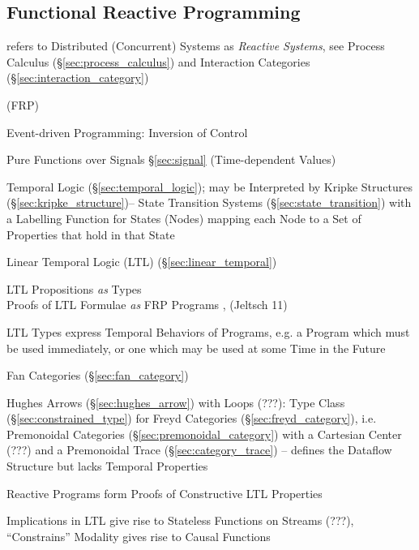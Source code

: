 \subsection{Functional Reactive Programming}\label{sec:frp}


\fist \cite{winskel-nielsen93} refers to Distributed (Concurrent)
Systems as \emph{Reactive Systems}, see Process Calculus
(\S\ref{sec:process_calculus}) and Interaction Categories
(\S\ref{sec:interaction_category})

(FRP)

Event-driven Programming: Inversion of Control %

Pure Functions over Signals \S\ref{sec:signal} (Time-dependent Values)

Temporal Logic (\S\ref{sec:temporal_logic}); may be Interpreted by
Kripke Structures (\S\ref{sec:kripke_structure})-- State Transition
Systems (\S\ref{sec:state_transition}) with a Labelling Function for
States (Nodes) mapping each Node to a Set of Properties that hold in
that State

Linear Temporal Logic (LTL) (\S\ref{sec:linear_temporal})

LTL Propositions \emph{as} Types \\
Proofs of LTL Formulae \emph{as} FRP Programs \cite{jeffrey12},
(Jeltsch 11)

LTL Types express Temporal Behaviors of Programs, e.g. a Program which
must be used immediately, or one which may be used at some Time in the
Future \cite{jeffrey12} %

Fan Categories (\S\ref{sec:fan_category}) \cite{jeltsch12}

Hughes Arrows (\S\ref{sec:hughes_arrow}) with Loops (???): Type Class
(\S\ref{sec:constrained_type}) for Freyd Categories
(\S\ref{sec:freyd_category}), i.e. Premonoidal Categories
(\S\ref{sec:premonoidal_category}) with a Cartesian Center (???) and a
Premonoidal Trace (\S\ref{sec:category_trace}) -- defines the Dataflow
Structure but lacks Temporal Properties \cite{jeffrey12}

Reactive Programs form Proofs of Constructive LTL Properties
\cite{jeffrey12}

Implications in LTL give rise to Stateless Functions on Streams (???),
``Constrains'' Modality gives rise to Causal Functions
\cite{jeffrey12} %

